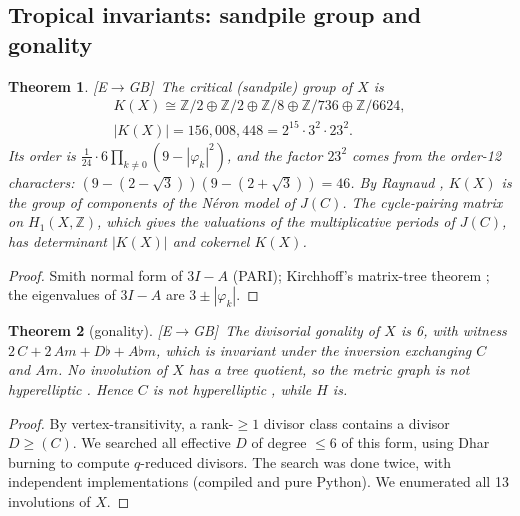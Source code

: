 \documentclass[11pt]{amsart}
\numberwithin{equation}{section}
\theoremstyle{plain}
\newtheorem{theorem}{Theorem}[section]
\theoremstyle{definition}\newtheorem{definition}[theorem]{Definition}
\theoremstyle{remark}\newtheorem{remark}[theorem]{Remark}
\newcommand{\Z}{\mathbb{Z}}\newcommand{\Q}{\mathbb{Q}}\newcommand{\C}{\mathbb{C}}\newcommand{\F}{\mathbb{F}}\newcommand{\R}{\mathbb{R}}
\newcommand{\ctag}[1]{\textup{\textsf{\scriptsize[#1]}}}
\begin{document}
\subsection{Tropical invariants: sandpile group and gonality}
\begin{theorem}\label{thm:sandpile}
\ctag{E$\to$GB}\ The critical (sandpile) group of $X$ is
\begin{gather*}K(X)\cong\Z/2\oplus\Z/2\oplus\Z/8\oplus\Z/736\oplus\Z/6624,\\ |K(X)|=156{,}008{,}448=2^{15}\cdot3^2\cdot23^2 .\end{gather*}
Its order is $\frac1{24}\cdot6\prod_{k\ne0}(9-|\varphi_k|^2)$, and the factor $23^2$ comes from the order-12 characters: $(9-(2-\sqrt3))(9-(2+\sqrt3))=46$. By Raynaud \cite{raynaud70}, $K(X)$ is the group of components of the N\'eron model of $J(C)$. The cycle-pairing matrix on $H_1(X,\Z)$, which gives the valuations of the multiplicative periods of $J(C)$, has determinant $|K(X)|$ and cokernel $K(X)$.
\end{theorem}
\begin{proof}
Smith normal form of $3I-A$ (PARI); Kirchhoff's matrix-tree theorem \cite{kirchhoff1847}; the eigenvalues of $3I-A$ are $3\pm|\varphi_k|$.
\end{proof}
\begin{theorem}[gonality]\label{thm:gon}
\ctag{E$\to$GB}\ The divisorial gonality of $X$ \cite{bn07} is 6, with witness $2\,C+2\,Am+D\flat+A\flat m$, which is invariant under the inversion exchanging $C$ and $Am$. No involution of $X$ has a tree quotient, so the metric graph is not hyperelliptic \cite{chan13}. Hence $C$ is not hyperelliptic \cite[Cor.~3.5]{baker08}, while $H$ is.
\end{theorem}
\begin{proof}
By vertex-transitivity, a rank-$\ge1$ divisor class contains a divisor $D\ge(C)$. We searched all effective $D$ of degree $\le6$ of this form, using Dhar burning to compute $q$-reduced divisors. The search was done twice, with independent implementations (compiled and pure Python). We enumerated all 13 involutions of $X$.
\end{proof}
\end{document}
